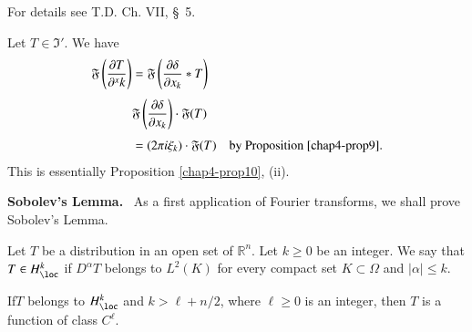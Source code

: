 For details see T.D. Ch. VII, \S\ 5.

\begin{example*}
Let $T\in \mathfrak{I}'$. We have
\begin{align*}
\mathfrak{F}\left(\frac{\partial T}{\partial^{x}k}\right) &= \mathfrak{F}\left(\frac{\partial \delta}{\partial x_k}\ast T\right)\\[3pt]
&\mathfrak{F}\left(\frac{\partial \delta}{\partial x_{k}}\right)\cdot \mathfrak{F}(T)\\[3pt]
&= (2\pi i\xi_{k})\cdot \mathfrak{F}(T)\quad\text{by Proposition \ref{chap4-prop9}.}
\end{align*}
This is essentially Proposition \ref{chap4-prop10}, (ii).
\end{example*}

\noindent
{\bf Sobolev's Lemma.}~
As a first application of Fourier transforms, we shall prove Sobolev's Lemma.

Let $T$ be a distribution in an open set of $\mathbb{R}^{n}$. Let $k\geq 0$ be an integer. We say that $T\in H^{k}_{\loc}$ if $D^{\alpha}T$ belongs to $L^{2}(K)$ for every compact set $K\subset \Omega$ and $|\alpha|\leq k$.

\begin{theorem}\label{chap4-thm3}
If\pageoriginale $T$ belongs to $H^{k}_{\loc}$ and $k>\ell + n/2$, where $\ell \geq 0$ is an integer, then $T$ is a function of class $C^{\ell}$.
\end{theorem}

